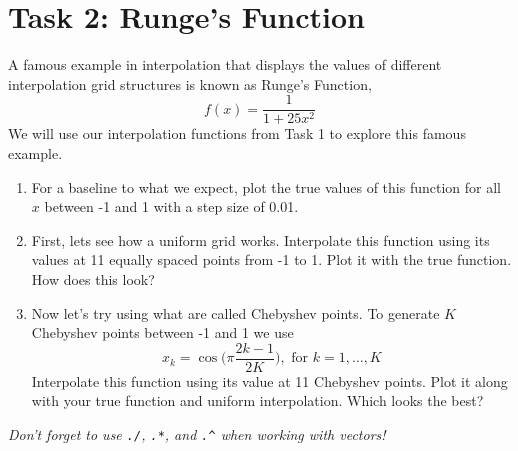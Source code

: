 \documentclass[11pt]{article}
\begin{document}
	\section*{Task 2: Runge's Function}
	\noindent A famous example in interpolation that displays the values of different interpolation grid structures is known as Runge's Function, 
	\begin{equation*}
		f(x) = \frac{1}{1+25x^2}
	\end{equation*}
	We will use our interpolation functions from Task 1 to explore this famous example.
	\begin{enumerate}[label=\alph*)]
		\item For a baseline to what we expect, plot the true values of this function for all $x$ between -1 and 1 with a step size of 0.01.
		\item First, lets see how a uniform grid works. Interpolate this function using its values at 11 equally spaced points from -1 to 1. Plot it with the true function. How does this look?
		\item Now let's try using what are called Chebyshev points. To generate $K$ Chebyshev points between -1 and 1 we use 
		\begin{equation*}
			x_k = \cos\Big(\pi\frac{2k-1}{2K}\Big), \text{ for } k= 1,\dots,K
		\end{equation*}
		Interpolate this function using its value at 11 Chebyshev points. Plot it along with your true function and uniform interpolation. Which looks the best?
		
	\end{enumerate}

	\begin{center}
		\vfill
		\textit{Don't forget to use \texttt{./}, \texttt{.*}, and \texttt{.\^} when working with vectors!}
	\end{center}
\end{document}
